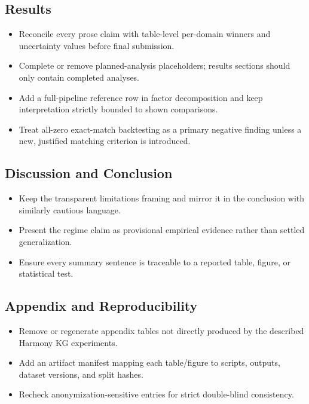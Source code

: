 \documentclass[11pt]{article}
\begin{document}
\subsection*{Results}
\begin{itemize}
  \item Reconcile every prose claim with table-level per-domain winners and uncertainty values before final submission.
  \item Complete or remove planned-analysis placeholders; results sections should only contain completed analyses.
  \item Add a full-pipeline reference row in factor decomposition and keep interpretation strictly bounded to shown comparisons.
  \item Treat all-zero exact-match backtesting as a primary negative finding unless a new, justified matching criterion is introduced.
\end{itemize}

\subsection*{Discussion and Conclusion}
\begin{itemize}
  \item Keep the transparent limitations framing and mirror it in the conclusion with similarly cautious language.
  \item Present the regime claim as provisional empirical evidence rather than settled generalization.
  \item Ensure every summary sentence is traceable to a reported table, figure, or statistical test.
\end{itemize}

\subsection*{Appendix and Reproducibility}
\begin{itemize}
  \item Remove or regenerate appendix tables not directly produced by the described Harmony KG experiments.
  \item Add an artifact manifest mapping each table/figure to scripts, outputs, dataset versions, and split hashes.
  \item Recheck anonymization-sensitive entries for strict double-blind consistency.
\end{itemize}
\end{document}
